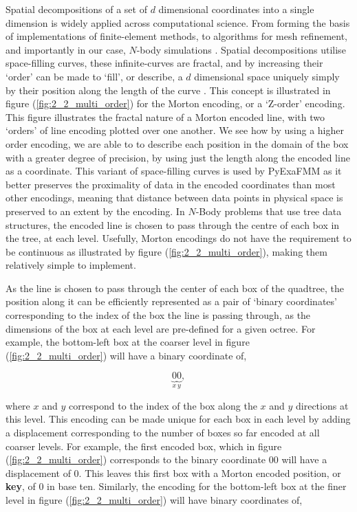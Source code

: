 Spatial decompositions of a set of $d$ dimensional coordinates into a single
dimension is widely applied across computational science.
From forming the basis of implementations of finite-element methods, to algorithms
for mesh refinement, and importantly in our case, $N$-body simulations
\cite{Sundar:2008:SIAM}. Spatial decompositions utilise space-filling curves,
these infinite-curves are fractal, and by increasing their `order' can be made
to `fill', or describe, a $d$ dimensional space uniquely simply by their position
along the length of the curve \cite{Campbell:2003:Williams}. This concept is
illustrated in figure (\ref{fig:2_2_multi_order}) for the Morton encoding, or a
`Z-order' encoding.  This figure illustrates the fractal nature of a Morton
encoded line, with two `orders' of line encoding plotted over one another. We see
how by using a higher order encoding, we are able to to describe each position
in the domain of the box with a greater degree of precision, by using just
the length along the encoded line as a coordinate. This variant of space-filling
curves is used by \gls{PyExaFMM} as it better preserves the proximality of data
in the encoded coordinates than most other encodings, meaning that distance
between data points in physical space is preserved to an extent by the encoding. In $N$-Body
problems that use tree data structures, the encoded line is chosen to pass through
the centre of each box in the tree, at each level. Usefully, Morton encodings
do not have the requirement to be continuous as illustrated by figure
(\ref{fig:2_2_multi_order}), making them relatively simple to implement.

As the line is chosen to pass through the center of each box of the quadtree,
 the position along it can be efficiently represented
 as a pair of `binary coordinates' corresponding to the index of the box the line
 is passing through, as the dimensions of the box at each level are pre-defined for a
 given octree. For example, the bottom-left box at the coarser level in figure (\ref{fig:2_2_multi_order})
 will have a binary coordinate of,

 \begin{equation}
     \underbrace{0}_{x}\underbrace{0}_{y},
 \end{equation}

 where $x$ and $y$ correspond to the index of the box along the $x$ and $y$
 directions at this level. This encoding can be made unique for each
 box in each level by adding a displacement corresponding to the number of boxes so far
 encoded at all coarser levels. For example, the first encoded box, which in figure (\ref{fig:2_2_multi_order})
 corresponds to the binary coordinate $00$ will have a displacement of 0.
 This leaves this first box with a Morton encoded position, or \textbf{\gls{key}},
 of 0 in base ten. Similarly, the encoding for the bottom-left box at the finer
 level in figure (\ref{fig:2_2_multi_order}) will have binary coordinates of,

